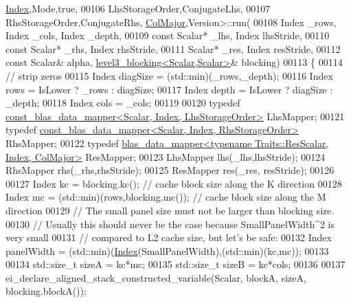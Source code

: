 \begin{DoxyCode}
      \hyperlink{namespace_eigen_a62e77e0933482dafde8fe197d9a2cfde}{Index},Mode,\textcolor{keyword}{true},
00106                                                         LhsStorageOrder,ConjugateLhs,
00107                                                         RhsStorageOrder,ConjugateRhs,
      \hyperlink{group__enums_ggaacded1a18ae58b0f554751f6cdf9eb13a0cbd4bdd0abcfc0224c5fcb5e4f6669a}{ColMajor},Version>::run(
00108     Index \_rows, Index \_cols, Index \_depth,
00109     \textcolor{keyword}{const} Scalar* \_lhs, Index lhsStride,
00110     \textcolor{keyword}{const} Scalar* \_rhs, Index rhsStride,
00111     Scalar* \_res,        Index resStride,
00112     \textcolor{keyword}{const} Scalar& alpha, \hyperlink{class_eigen_1_1internal_1_1level3__blocking}{level3\_blocking<Scalar,Scalar>}& blocking)
00113   \{
00114     \textcolor{comment}{// strip zeros}
00115     Index diagSize  = (std::min)(\_rows,\_depth);
00116     Index rows      = IsLower ? \_rows : diagSize;
00117     Index depth     = IsLower ? diagSize : \_depth;
00118     Index cols      = \_cols;
00119     
00120     \textcolor{keyword}{typedef} \hyperlink{class_eigen_1_1internal_1_1const__blas__data__mapper}{const\_blas\_data\_mapper<Scalar, Index, LhsStorageOrder>}
       LhsMapper;
00121     \textcolor{keyword}{typedef} \hyperlink{class_eigen_1_1internal_1_1const__blas__data__mapper}{const\_blas\_data\_mapper<Scalar, Index, RhsStorageOrder>}
       RhsMapper;
00122     \textcolor{keyword}{typedef} \hyperlink{class_eigen_1_1internal_1_1blas__data__mapper}{blas\_data\_mapper<typename Traits::ResScalar, Index, ColMajor>}
       ResMapper;
00123     LhsMapper lhs(\_lhs,lhsStride);
00124     RhsMapper rhs(\_rhs,rhsStride);
00125     ResMapper res(\_res, resStride);
00126 
00127     Index kc = blocking.kc();                   \textcolor{comment}{// cache block size along the K direction}
00128     Index mc = (std::min)(rows,blocking.mc());  \textcolor{comment}{// cache block size along the M direction}
00129     \textcolor{comment}{// The small panel size must not be larger than blocking size.}
00130     \textcolor{comment}{// Usually this should never be the case because SmallPanelWidth^2 is very small}
00131     \textcolor{comment}{// compared to L2 cache size, but let's be safe:}
00132     Index panelWidth = (std::min)(\hyperlink{namespace_eigen_a62e77e0933482dafde8fe197d9a2cfde}{Index}(SmallPanelWidth),(std::min)(kc,mc));
00133 
00134     std::size\_t sizeA = kc*mc;
00135     std::size\_t sizeB = kc*cols;
00136 
00137     ei\_declare\_aligned\_stack\_constructed\_variable(Scalar, blockA, sizeA, blocking.blockA());

\end{DoxyCode}
